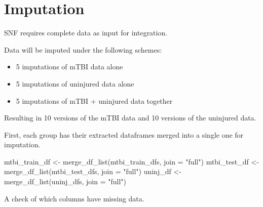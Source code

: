 \documentclass[
  letterpaper,
  DIV=11,
  numbers=noendperiod]{scrreprt}
\newenvironment{Shaded}{\begin{snugshade}}{\end{snugshade}}
\newcommand{\AttributeTok}[1]{\textcolor[rgb]{0.40,0.45,0.13}{#1}}
\newcommand{\FunctionTok}[1]{\textcolor[rgb]{0.28,0.35,0.67}{#1}}
\newcommand{\NormalTok}[1]{\textcolor[rgb]{0.00,0.23,0.31}{#1}}
\newcommand{\OtherTok}[1]{\textcolor[rgb]{0.00,0.23,0.31}{#1}}
\newcommand{\StringTok}[1]{\textcolor[rgb]{0.13,0.47,0.30}{#1}}
\providecommand{\tightlist}{%
  \setlength{\itemsep}{0pt}\setlength{\parskip}{0pt}}\usepackage{longtable,booktabs,array}
\begin{document}
\section{Imputation}\label{imputation}

SNF requires complete data as input for integration.

Data will be imputed under the following schemes:

\begin{itemize}
\tightlist
\item
  5 imputations of mTBI data alone
\item
  5 imputations of uninjured data alone
\item
  5 imputations of mTBI + uninjured data together
\end{itemize}

Resulting in 10 versions of the mTBI data and 10 versions of the
uninjured data.

First, each group has their extracted dataframes merged into a single
one for imputation.

\begin{Shaded}
\begin{Highlighting}[]
\NormalTok{mtbi\_train\_df }\OtherTok{\textless{}{-}} \FunctionTok{merge\_df\_list}\NormalTok{(mtbi\_train\_dfs, }\AttributeTok{join =} \StringTok{"full"}\NormalTok{)}
\NormalTok{mtbi\_test\_df }\OtherTok{\textless{}{-}} \FunctionTok{merge\_df\_list}\NormalTok{(mtbi\_test\_dfs, }\AttributeTok{join =} \StringTok{"full"}\NormalTok{)}
\NormalTok{uninj\_df }\OtherTok{\textless{}{-}} \FunctionTok{merge\_df\_list}\NormalTok{(uninj\_dfs, }\AttributeTok{join =} \StringTok{"full"}\NormalTok{)}
\end{Highlighting}
\end{Shaded}

A check of which columns have missing data.
\end{document}
